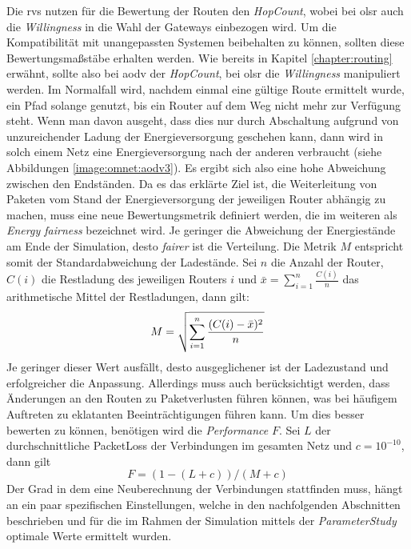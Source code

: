 Die \glspl{rv} nutzen für die Bewertung der Routen den \textit{HopCount}, wobei bei \gls{olsr} auch die \textit{Willingness} in die Wahl der Gateways einbezogen wird. Um die Kompatibilität mit unangepassten Systemen beibehalten zu können, sollten diese Bewertungsmaßstäbe erhalten werden. Wie bereits in Kapitel \ref{chapter:routing} erwähnt, sollte also bei \gls{aodv} der \textit{HopCount}, bei \gls{olsr} die \textit{Willingness} manipuliert werden. Im Normalfall wird, nachdem einmal eine gültige Route ermittelt wurde, ein Pfad solange genutzt, bis ein Router auf dem Weg nicht mehr zur Verfügung steht. Wenn man davon ausgeht, dass dies nur durch Abschaltung aufgrund von unzureichender Ladung der Energieversorgung geschehen kann, dann wird in solch einem Netz eine Energieversorgung nach der anderen verbraucht (siehe Abbildungen \ref{image:omnet:aodv3}). Es ergibt sich also eine hohe Abweichung zwischen den Endständen. Da es das erklärte Ziel ist, die Weiterleitung von Paketen vom Stand der Energieversorgung der jeweiligen Router abhängig zu machen, muss eine neue Bewertungsmetrik definiert werden, die im weiteren als \textit{Energy fairness} bezeichnet wird. Je geringer die Abweichung der Energiestände am Ende der Simulation, desto \textit{fairer} ist die Verteilung. Die Metrik $M$ entspricht somit der Standardabweichung der Ladestände. Sei $n$ die Anzahl der Router, $C(i)$ die Restladung des jeweiligen Routers $i$ und $\bar{x} = \sum_{i=1}^{n} \frac{C(i)}{n}$ das arithmetische Mittel der Restladungen, dann gilt:
\begin{displaymath}
M = \sqrt{\sum_{i=1}^{n} \frac{(C(i)-\bar{x})^2}{n}} \\
\end{displaymath}
Je geringer dieser Wert ausfällt, desto ausgeglichener ist der Ladezustand und erfolgreicher die Anpassung. Allerdings muss auch berücksichtigt werden, dass Änderungen an den Routen zu Paketverlusten führen können, was bei häufigem Auftreten zu eklatanten Beeinträchtigungen führen kann. Um dies besser bewerten zu können, benötigen wird die \textit{Performance} $F$. Sei $L$ der durchschnittliche PacketLoss der Verbindungen im gesamten Netz und $c=10^{-10}$, dann gilt
\begin{displaymath}
F = ( 1 - ( L + c ) ) / ( M + c )
\end{displaymath}
Der Grad in dem eine Neuberechnung der Verbindungen stattfinden muss, hängt an ein paar spezifischen Einstellungen, welche in den nachfolgenden Abschnitten beschrieben und für die im Rahmen der Simulation mittels der \textit{ParameterStudy} optimale Werte ermittelt wurden.


